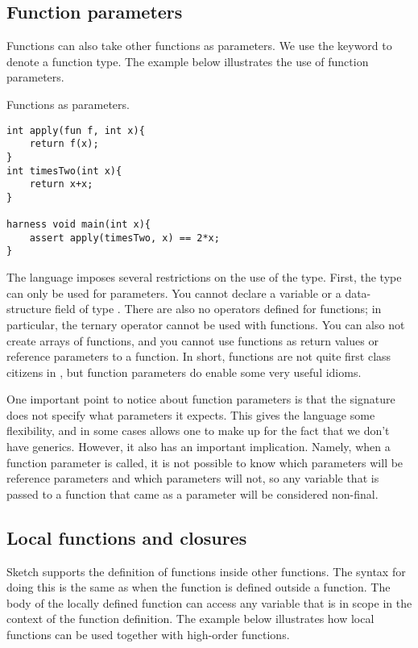 \subsection{Function parameters}
Functions can also take other functions as parameters. We use the keyword  to denote a function type. The example below illustrates the use of function parameters.
\begin{Example}
Functions as parameters.
\begin{lstlisting}
int apply(fun f, int x){
	return f(x);
}
int timesTwo(int x){
	return x+x;
}

harness void main(int x){
	assert apply(timesTwo, x) == 2*x;
}
\end{lstlisting}
\end{Example}

The language imposes several restrictions on the use of the  type. First, the type can only be used for parameters. You cannot declare a variable or a data-structure field of type . There are also no operators defined for functions; in particular, the ternary operator  cannot be used with functions. You can also not create arrays of functions, and you cannot use functions as return values or reference parameters to a function. In short, functions are not quite first class citizens in \Sk{}, but function parameters do enable some very useful idioms.

One important point to notice about function parameters is that the signature does not specify what parameters it expects. This gives the language some flexibility, and in some cases allows one to make up for the fact that we don't have generics. However, it also has an important implication. Namely, when a function parameter is called, it is not possible to know which parameters will be reference parameters and which parameters will not, so any variable that is passed to a function that came as a parameter will be considered non-final.

\subsection{Local functions and closures}
Sketch supports the definition of functions inside other functions. The syntax for doing this is the same as when the function is defined outside a function. The body of the locally defined function can access any variable that is in scope in the context of the function definition. The example below illustrates how local functions can be used together with high-order functions.

